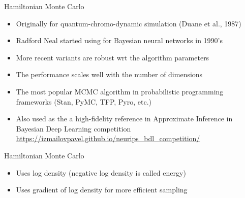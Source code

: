 \documentclass[finnish,english,t]{beamer}
\begin{document}
\begin{frame}{Hamiltonian Monte Carlo}

  \begin{itemize}
  \item<+-> Originally for quantum-chromo-dynamic simulation (Duane et
    al., 1987)
  \item<+-> Radford Neal started using for Bayesian neural networks in 1990's
  \item<+-> More recent variants are robust wrt the algorithm parameters
  \item<+-> The performance scales well with the number of dimensions
  \item<+-> The most popular MCMC algorithm in probabilistic programming
    frameworks (Stan, PyMC, TFP, Pyro, etc.)
  \item<+-> Also used as the a high-fidelity reference in Approximate
    Inference in Bayesian Deep Learning competition
    \url{https://izmailovpavel.github.io/neurips_bdl_competition/}
  \end{itemize}
  
\end{frame}

\begin{frame}{Hamiltonian Monte Carlo}

  \vspace{-0.5\baselineskip}
  \begin{itemize}
  \item Uses log density (negative log density is called energy)
  \item Uses gradient of log density for more efficient sampling
  \end{itemize}
  \vspace{-0.6\baselineskip}
\end{frame}
\end{document}
